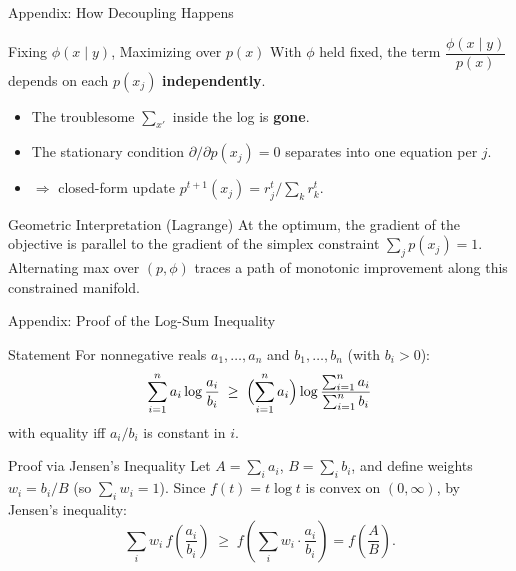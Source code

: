 \documentclass{beamer}
\begin{document}
\begin{frame}{Appendix: How Decoupling Happens}
    \begin{block}{Fixing $\phi(x\mid y)$, Maximizing over $p(x)$}
        With $\phi$ held fixed, the term $\dfrac{\phi(x\mid y)}{p(x)}$ depends on each $p(x_j)$ \textbf{independently}.
        \begin{itemize}
            \item The troublesome $\sum_{x'}$ inside the log is \textbf{gone}.
            \item The stationary condition $\partial / \partial p(x_j) = 0$ separates into one equation per $j$.
            \item $\Rightarrow$ closed-form update $p^{t+1}(x_j) = r_j^t / \sum_k r_k^t$.
        \end{itemize}
    \end{block}

    \begin{alertblock}{Geometric Interpretation (Lagrange)}
        At the optimum, the gradient of the objective is parallel to the gradient of the simplex constraint $\sum_j p(x_j)=1$. Alternating max over $(p, \phi)$ traces a path of monotonic improvement along this constrained manifold.
    \end{alertblock}
\end{frame}

\begin{frame}{Appendix: Proof of the Log-Sum Inequality}
    \begin{block}{Statement}
        For nonnegative reals $a_1,\ldots,a_n$ and $b_1,\ldots,b_n$ (with $b_i > 0$):
        $$
            \sum_{i=1}^{n} a_i \log \frac{a_i}{b_i} \;\geq\; \Bigl(\sum_{i=1}^{n} a_i\Bigr) \log \frac{\sum_{i=1}^{n} a_i}{\sum_{i=1}^{n} b_i}
        $$
        with equality iff $a_i / b_i$ is constant in $i$.
    \end{block}

    \begin{block}{Proof via Jensen's Inequality}
        Let $A = \sum_i a_i$, $B = \sum_i b_i$, and define weights $w_i = b_i / B$ (so $\sum_i w_i = 1$). Since $f(t) = t\log t$ is convex on $(0,\infty)$, by Jensen's inequality:
        $$
            \sum_i w_i\, f\!\left(\frac{a_i}{b_i}\right) \;\geq\; f\!\left(\sum_i w_i \cdot \frac{a_i}{b_i}\right) = f\!\left(\frac{A}{B}\right).
        $$
    \end{block}
\end{frame}
\end{document}

